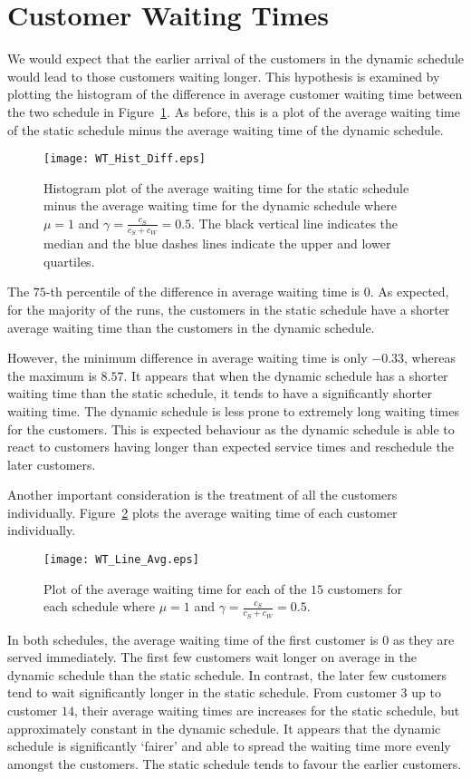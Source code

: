 \section{Customer Waiting Times}
We would expect that the earlier arrival of the customers in the dynamic schedule would lead to those customers waiting longer. This hypothesis is examined by plotting the histogram of the difference in average customer waiting time between the two schedule in Figure~\ref{fig:Diff_Wait}. As before, this is a plot of the average waiting time of the static schedule minus the average waiting time of the dynamic schedule.
\begin{figure}[htb]
	\centering
	\texttt{[image: WT\_Hist\_Diff.eps]}
	\caption{Histogram plot of the average waiting time for the static schedule minus the average waiting time for the dynamic schedule where $\mu = 1$ and $\gamma = \frac{c_{S}}{c_{S} + c_{W}} = 0.5$. The black vertical line indicates the median and the blue dashes lines indicate the upper and lower quartiles.}
	\label{fig:Diff_Wait}
\end{figure}

The $75$-th percentile of the difference in average waiting time is $0$. As expected, for the majority of the runs, the customers in the static schedule have a shorter average waiting time than the customers in the dynamic schedule.

However, the minimum difference in average waiting time is only $-0.33$, whereas the maximum is $8.57$. It appears that when the dynamic schedule has a shorter waiting time than the static schedule, it tends to have a significantly shorter waiting time. The dynamic schedule is less prone to extremely long waiting times for the customers. This is expected behaviour as the dynamic schedule is able to react to customers having longer than expected service times and reschedule the later customers.

Another important consideration is the treatment of all the customers individually. Figure~\ref{fig:Avg_Wait_Position} plots the average waiting time of each customer individually.
\begin{figure}[htb]
	\centering
	\texttt{[image: WT\_Line\_Avg.eps]}
	\caption{Plot of the average waiting time for each of the $15$ customers for each schedule where $\mu = 1$ and $\gamma = \frac{c_{S}}{c_{S} + c_{W}} = 0.5$.}
	\label{fig:Avg_Wait_Position}
\end{figure}

In both schedules, the average waiting time of the first customer is $0$ as they are served immediately. The first few customers wait longer on average in the dynamic schedule than the static schedule. In contrast, the later few customers tend to wait significantly longer in the static schedule. From customer $3$ up to customer $14$, their average waiting times are increases for the static schedule, but approximately constant in the dynamic schedule. It appears that the dynamic schedule is significantly `fairer' and able to spread the waiting time more evenly amongst the customers. The static schedule tends to favour the earlier customers.

